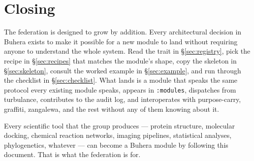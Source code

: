 \documentclass[11pt,a4paper]{article}
\theoremstyle{contract}
\begin{document}
\section{Closing}
\label{sec:closing}

The federation is designed to grow by addition. Every architectural
decision in Buhera exists to make it possible for a new module to land
without requiring anyone to understand the whole system. Read the trait
in \S\ref{sec:registry}, pick the recipe in \S\ref{sec:recipes} that
matches the module's shape, copy the skeleton in \S\ref{sec:skeleton},
consult the worked example in \S\ref{sec:example}, and run through the
checklist in \S\ref{sec:checklist}. What lands is a module that speaks
the same protocol every existing module speaks, appears in
\texttt{:modules}, dispatches from turbulance, contributes to the audit
log, and interoperates with purpose-carry, graffiti, zangalewa, and the
rest without any of them knowing about it.

Every scientific tool that the group produces --- protein structure,
molecular docking, chemical reaction networks, imaging pipelines,
statistical analyses, phylogenetics, whatever --- can become a Buhera
module by following this document. That is what the federation is for.
\end{document}
